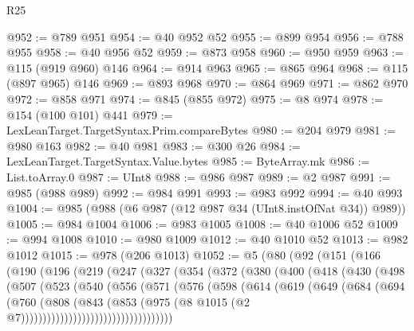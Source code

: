\begin{lexlean}{R25}
\begin{coremodule}
@952 := @789 @951
@954 := @40 @952 @52
@955 := @899 @954
@956 := @788 @955
@958 := @40 @956 @52
@959 := @873 @958
@960 := @950 @959
@963 := @115 (@919 @960) @146
@964 := @914 @963
@965 := @865 @964
@968 := @115 (@897 @965) @146
@969 := @893 @968
@970 := @864 @969
@971 := @862 @970
@972 := @858 @971
@974 := @845 (@855 @972)
@975 := @8 @974
@978 := @154 (@100 @101) @441
@979 := LexLeanTarget.TargetSyntax.Prim.compareBytes
@980 := @204 @979
@981 := @980 @163
@982 := @40 @981
@983 := @300 @26
@984 := LexLeanTarget.TargetSyntax.Value.bytes
@985 := ByteArray.mk
@986 := List.toArray.{0}
@987 := UInt8
@988 := @986 @987
@989 := @2 @987
@991 := @985 (@988 @989)
@992 := @984 @991
@993 := @983 @992
@994 := @40 @993
@1004 := @985 (@988 (@6 @987 (@12 @987 @34 (UInt8.instOfNat @34)) @989))
@1005 := @984 @1004
@1006 := @983 @1005
@1008 := @40 @1006 @52
@1009 := @994 @1008
@1010 := @980 @1009
@1012 := @40 @1010 @52
@1013 := @982 @1012
@1015 := @978 (@206 @1013)
@1052 := @5
    (@80
      (@92
        (@151
          (@166
            (@190
              (@196
                (@219
                  (@247
                    (@327
                      (@354
                        (@372
                          (@380
                            (@400
                              (@418
                                (@430
                                  (@498
                                    (@507
                                      (@523
                                        (@540
                                          (@556
                                            (@571
                                              (@576
                                                (@598
                                                  (@614
                                                    (@619
                                                      (@649
                                                        (@684
                                                          (@694
                                                            (@760
                                                              (@808
                                                                (@843
                                                                  (@853
                                                                    (@975
                                                                      (@8
                                                                        @1015
                                                                        (@2
                                                                          @7)))))))))))))))))))))))))))))))))))

\end{coremodule}
\end{lexlean}
